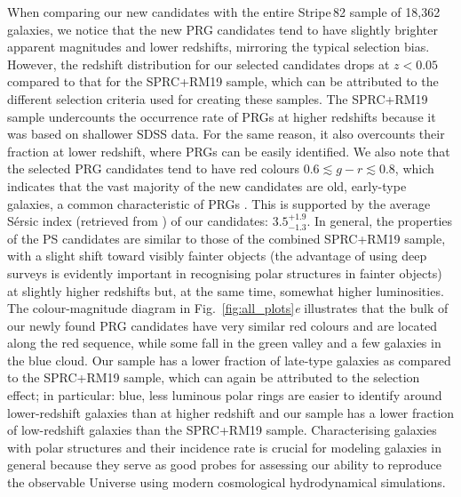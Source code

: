 \documentclass[letter]{aa}
\begin{document}
When comparing our new candidates with the entire Stripe\,82 sample of 18,362 galaxies, we notice that the new PRG candidates tend to have slightly brighter apparent magnitudes and lower redshifts, mirroring the typical selection bias. However, the redshift distribution for our selected candidates drops at $z<0.05$ compared to that for the SPRC+RM19 sample, which can be attributed to the different selection criteria used for creating these samples. The SPRC+RM19 sample undercounts the occurrence rate of PRGs at higher redshifts because it was based on shallower SDSS data. For the same reason, it also overcounts their fraction at lower redshift, where PRGs can be easily identified. We also note that the selected PRG candidates tend to have red colours $0.6\lesssim g-r \lesssim0.8$, which indicates that the vast majority of the new candidates are old, early-type galaxies, a common characteristic of PRGs \citep[see e.g.][]{1990AJ....100.1489W}. This is supported by the average S\'ersic index (retrieved from \citealt{2019MNRAS.486..390B}) of our candidates: $3.5^{+1.9}_{-1.3}$. 
In general, the properties of the PS candidates are similar to those of the combined SPRC+RM19 sample, with a slight shift toward visibly fainter objects (the advantage of using deep surveys is evidently important in recognising polar structures in fainter objects) at slightly higher redshifts but, at the same time, somewhat higher luminosities. 
The colour-magnitude diagram in Fig.~\ref{fig:all_plots}{\it e} illustrates that
the bulk of our newly found PRG candidates have very similar red colours
and are located along the red sequence, while some fall in the green valley and a few galaxies in the blue cloud. Our sample has a lower fraction of late-type galaxies as compared to the SPRC+RM19 sample, which can again be attributed to the selection effect; in particular: blue, less luminous polar rings are easier to identify around lower-redshift galaxies than at higher redshift and our sample has a lower fraction of low-redshift galaxies than the SPRC+RM19 sample. Characterising galaxies with polar structures and their incidence rate is crucial for modeling galaxies in general because they serve as good probes for assessing our ability to reproduce the observable Universe using modern cosmological hydrodynamical simulations.
\end{document}
